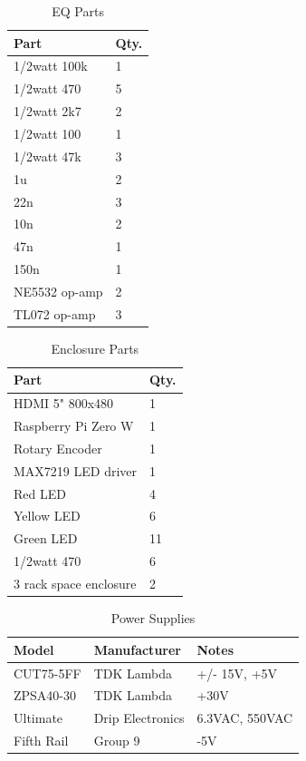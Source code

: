 \documentclass[journal]{IEEEtran}
\begin{document}
	\begin{table}[]
		\centering
		\caption{EQ Parts}
		\label{tab:eq}
		\begin{tabular}{l|l}
			Part                               & Qty. \\ \hline
			1/2watt 100k  & 1 \\ 
			1/2watt 470   & 5 \\
			1/2watt 2k7   & 2 \\
			1/2watt 100   & 1 \\
			1/2watt 47k   & 3 \\
			1u            & 2 \\
			22n           & 3 \\
			10n           & 2 \\
			47n           & 1 \\
			150n          & 1 \\
			NE5532 op-amp & 2 \\
			TL072 op-amp  & 3
		\end{tabular}
	\end{table}

	\begin{table}[]
		\centering
		\caption{Enclosure Parts}
		\label{tab:enclosure}
		\begin{tabular}{l|l}
			Part                               & Qty. \\ \hline
			HDMI 5" 800x480    & 1  \\
			Raspberry Pi Zero W    & 1  \\
			Rotary Encoder     & 1  \\
			MAX7219 LED driver & 1  \\
			Red LED            & 4  \\
			Yellow LED         & 6  \\
			Green LED          & 11 \\
			1/2watt 470        & 6  \\
			3 rack space enclosure & 2
		\end{tabular}
	\end{table}


	\begin{table}[]
		\centering
		\caption{Power Supplies}
		\label{tab:powerSupplies}
		\begin{tabular}{l|l|l}

			Model     & Manufacturer     & Notes          \\\hline
			CUT75-5FF & TDK Lambda       & +/- 15V, +5V    \\
			ZPSA40-30 & TDK Lambda       & +30V           \\
			Ultimate  & Drip Electronics & 6.3VAC, 550VAC \\
			Fifth Rail  & Group 9 & -5V
		\end{tabular}
	\end{table}


	

	
	\ifCLASSOPTIONcaptionsoff
	\newpage
	\fi
	
	
	
	
	
\end{document}
